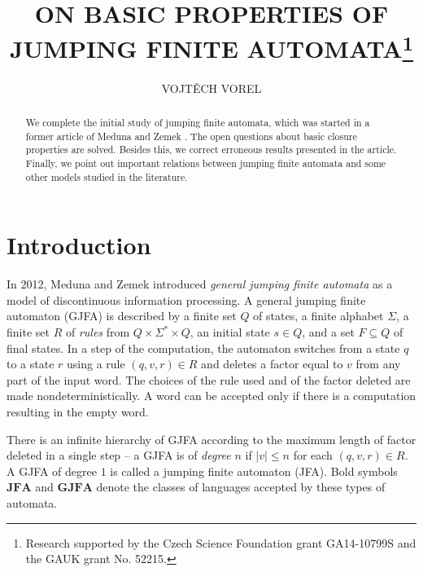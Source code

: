 \documentclass{ws-ijmpc}
\begin{document}
\title{\uppercase{On Basic Properties of Jumping Finite Automata}\footnote{Research supported by the Czech Science Foundation grant GA14-10799S and the GAUK grant No. 52215.}}

\author{\uppercase{Vojt\v{e}ch Vorel}}
\address{Department of Theoretical Computer Science and Mathematical Logic,\\
Charles University,\\ Malostransk\'{e} n\'{a}m. 25, Prague, Czech Republic\\ vorel@ktiml.mff.cuni.cz}

\maketitle

\begin{abstract} We complete the initial study of jumping finite automata, which was started in a former article of Meduna and Zemek \citep{athMED1}. The open questions about basic closure properties are solved. Besides this, we correct erroneous results presented in the article. Finally, we point out important relations between jumping finite automata and some other models studied in the literature. \end{abstract}



\section{Introduction}

In 2012, Meduna and Zemek \citep{athMED1} introduced \emph{general
jumping finite automata} as a model of discontinuous information processing.
A general jumping finite automaton (GJFA) is described by a finite
set $Q$ of states, a finite alphabet $\Sigma$, a finite set $R$
of \emph{rules }from $Q\times\Sigma^{*}\times Q$, an initial state
$s\in Q$, and a set $F\subseteq Q$ of final states. In a step of
the computation, the automaton switches from a state $q$ to a state
$r$ using a rule $\left(q,v,r\right)\in R$ and deletes a factor
equal to $v$ from any part of the input word. The choices of the
rule used and of the factor deleted are made nondeterministically.
A word can be accepted only if there is a computation resulting in
the empty word.

There is an infinite hierarchy of GJFA according to the maximum length
of factor deleted in a single step -- a GJFA is of \emph{degree} $n$
if $\left|v\right|\le n$ for each $\left(q,v,r\right)\in R$. A GJFA
of degree $1$ is called a jumping finite automaton\emph{ }(JFA).
Bold symbols $\mathbf{JFA}$ and $\mathbf{GJFA}$ denote the classes
of languages accepted by these types of automata. 
\end{document}
